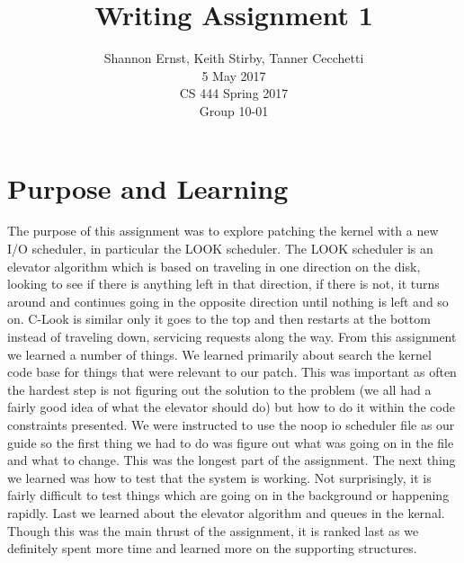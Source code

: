 \documentclass[letterpaper,10pt,serif,draftclsnofoot,onecolumn,compsoc,titlepage]{IEEEtran}
\title{Writing Assignment 1}
\author{Shannon Ernst, Keith Stirby, Tanner Cecchetti\\ 5 May 2017 \\ CS 444 Spring 2017 \\ Group 10-01}
\begin{document}
\maketitle
\begin{abstract}
\end{abstract}
\newpage
\tableofcontents
\newpage
\section{Purpose and Learning}
The purpose of this assignment was to explore patching the kernel with a 
new I/O scheduler, in particular the LOOK scheduler. The LOOK scheduler is 
an elevator algorithm which is based on traveling in one direction on the 
disk, looking to see if there is anything left in that direction, if there 
is not, it turns around and continues going in the opposite direction 
until nothing is left and so on. C-Look is similar only it goes to the 
top and then restarts at the bottom instead of traveling down, servicing 
requests along the way. From this assignment we learned a number of things. 
We learned primarily about search the kernel code base for things that 
were relevant to our patch. This was important as often the hardest step 
is not figuring out the solution to the problem (we all had a fairly good 
idea of what the elevator should do) but how to do it within the code 
constraints presented. We were instructed to use the noop io scheduler file 
as our guide so the first thing we had to do was figure out what was going 
on in the file and what to change. This was the longest part of the 
assignment. The next thing we learned was how to test that the system is 
working. Not surprisingly, it is fairly difficult to test things which 
are going on in the background or happening rapidly. Last we learned about 
the elevator algorithm and queues in the kernal. Though this was the main 
thrust of the assignment, it is ranked last as we definitely spent more 
time and learned more on the supporting structures. 
\end{document}
